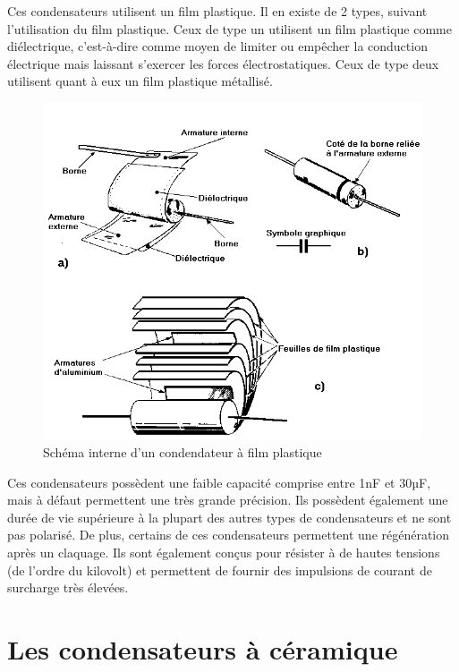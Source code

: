 Ces condensateurs utilisent un film plastique. Il en existe de 2 types, suivant l’utilisation du film plastique.  Ceux de type un utilisent un film plastique comme diélectrique, c’est-à-dire comme moyen de limiter ou empêcher la conduction électrique mais laissant s’exercer les forces électrostatiques. Ceux de type deux utilisent quant à eux un film plastique métallisé. \\


\begin{figure}[!h]
    \centering
    \includegraphics[scale=0.5]{./picture4/condo_film.png}
    \caption{Schéma interne d'un condendateur à film plastique}
\end{figure}

Ces condensateurs possèdent une faible capacité comprise entre 1nF et 30µF, mais à défaut permettent une très grande précision. Ils possèdent également une durée de vie supérieure à la plupart des autres types de condensateurs et ne sont pas polarisé. De plus, certains de ces condensateurs permettent une régénération après un claquage. Ils sont également conçus pour résister à de hautes tensions (de l’ordre du kilovolt) et permettent de fournir des impulsions de courant de surcharge très élevées.

\newpage
\section{Les condensateurs à céramique}

